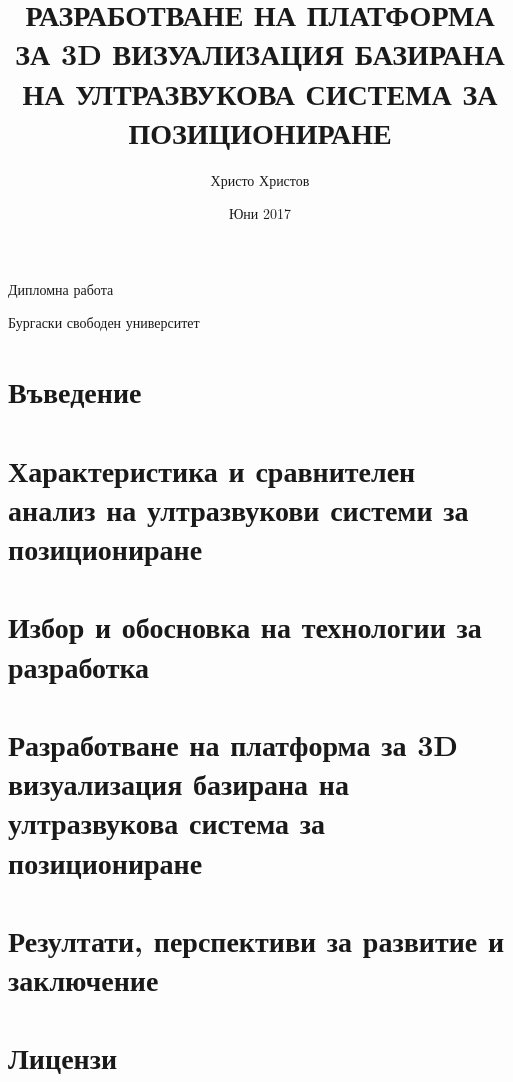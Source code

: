 \documentclass{article}
\title{РАЗРАБОТВАНЕ НА ПЛАТФОРМА ЗА 3D ВИЗУАЛИЗАЦИЯ БАЗИРАНА НА УЛТРАЗВУКОВА СИСТЕМА ЗА ПОЗИЦИОНИРАНЕ}
\author{Христо Христов}
\date{Юни 2017}
\begin{document}
\maketitle

\centerline{\large{Дипломна работа}}
\centerline{\large{Бургаски свободен университет}}

\tableofcontents

\section{Въведение}



\section{Характеристика и сравнителен анализ на ултразвукови системи за позициониране}



\section{Избор и обосновка на технологии за разработка}


\section{Разработване на платформа за 3D визуализация базирана на ултразвукова система за позициониране}


\section{Резултати, перспективи за развитие и заключение}


\section{Лицензи}


\printbibliography
\end{document}
